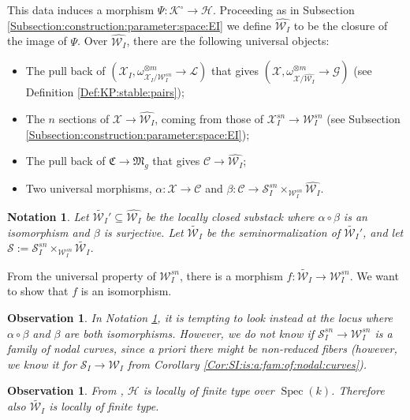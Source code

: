 \documentclass[11pt]{amsart}
\newcommand{\cC}{\mathcal{C}}
\newcommand{\cE}{\mathcal{W}}
\newcommand{\kC}{\mathfrak{C}}
\newcommand{\kM}{\mathfrak{M}}
\newcommand{\sG}{\mathscr{G}}
\newcommand{\sH}{\mathscr{H}}
\newcommand{\sL}{\mathscr{L}}
\newcommand{\sS}{\mathscr{S}}
\newcommand{\sX}{\mathscr{X}}
\newcommand{\cX}{\mathcal{X}}
\newcommand{\cS}{\mathcal{S}}
\newcommand{\spec}{\operatorname{Spec}}
\newcommand{\Kg}{\mathcal{K}}
\newtheorem{Oss}[theorem]{Observation}
\newtheorem{Notation}[theorem]{Notation}
\theoremstyle{definition}
\begin{document}
This data induces a morphism
 $\Psi:\Kg^\circ \to \sH$.
Proceeding as in Subsection \ref{Subsection:construction:parameter:space:EI} we
define $\widehat{\cE_I}$ to be the closure of the image of $\Psi$.
Over $\widehat{\mathcal{W}_{I}}$, there are the following universal objects:
\begin{itemize}
 \item The pull back of $(\sX_I,\omega_{\sX_I/\cE_I^{sn}}^{\otimes m} \to \sL)$ that gives $(\cX,\omega_{\cX/\widehat{\cE_I}}^{\otimes m} \to \sG)$ (see Definition \ref{Def:KP:stable:pairs});
 \item The $n$ sections of $\cX \to \widehat{\cE_I}$, coming from those of $\sX_I^{sn} \to \cE_I^{sn}$ (see Subsection \ref{Subsection:construction:parameter:space:EI}); 
 \item The pull back of $\kC \to \kM_g$ that gives $\cC \to \widehat{\cE_I}$;
 \item Two universal morphisms, $\alpha:\cX \to \cC$ and $\beta:\cC \to \sS_I^{sn} \times_{\cE_I^{sn}}\widehat{\cE_I}$. 
\end{itemize}
\begin{Notation}\label{Def:the:section:is:a:section}
 Let $\widetilde{\cE_I}' \subseteq \widehat{\cE_I}$ be the locally closed substack where
 $\alpha \circ \beta$ is an isomorphism and $\beta$ is surjective. Let
 $\widetilde{\cE_I}$ be the seminormalization of $\widetilde{\cE_I}'$, and let
$\cS:=\sS_I^{sn} \times_{\cE_I^{sn}}\widetilde{\cE_I}$.
\end{Notation}
From the universal property of $\cE_I^{sn}$, there is a morphism $f:\widetilde{\cE_I} \to \cE_I^{sn}$.
We want to show that $f$ is an isomorphism.
\begin{Oss}In Notation \ref{Def:the:section:is:a:section}, it is tempting to look instead at the locus where $\alpha \circ \beta$ and $\beta$ are both isomorphisms. However, we do not know if $\sS_I^{sn} \to \cE_I^{sn}$ is a family of nodal curves, since a priori there might be non-reduced fibers (however, we know it for $\sS_I \to \cE_I$ from Corollary \ref{Cor:SI:is:a:fam:of:nodal:curves}). 
\end{Oss} 
\begin{Oss}
 From \cite{Homstack}, $\sH$ is locally of finite type over $\spec(k)$. Therefore also $\widetilde{\cE_I}$ is
 locally of finite type.
\end{Oss}
\end{document}
